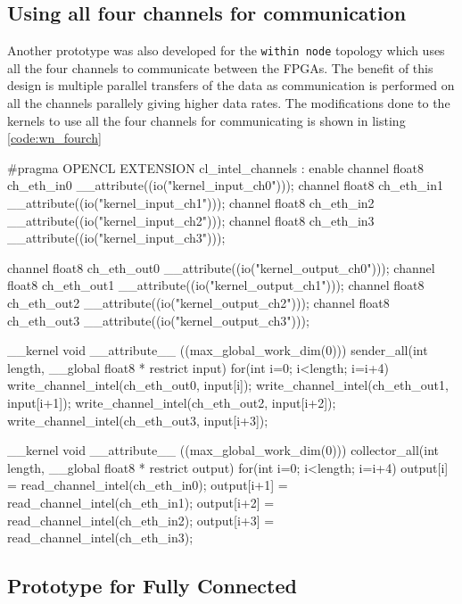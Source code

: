 \subsection*{Using all four channels for communication}

Another prototype was also developed for the \texttt{within node} topology which uses all the four channels
to communicate between the FPGAs. The benefit of this design is multiple parallel transfers of the data
as communication is performed on all the channels parallely giving higher data rates. The modifications
done to the kernels to use all the four channels for communicating is shown in listing \ref{code:wn_fourch}

\begin{CppCode}[caption=Kernels for \texttt{within node} using four channels, frame=tlrb, label=code:wn_fourch]
#pragma OPENCL EXTENSION cl_intel_channels : enable
channel float8 ch_eth_in0 __attribute((io("kernel_input_ch0")));
channel float8 ch_eth_in1 __attribute((io("kernel_input_ch1")));
channel float8 ch_eth_in2 __attribute((io("kernel_input_ch2")));
channel float8 ch_eth_in3 __attribute((io("kernel_input_ch3")));

channel float8 ch_eth_out0 __attribute((io("kernel_output_ch0")));
channel float8 ch_eth_out1 __attribute((io("kernel_output_ch1")));
channel float8 ch_eth_out2 __attribute((io("kernel_output_ch2")));
channel float8 ch_eth_out3 __attribute((io("kernel_output_ch3")));

__kernel void __attribute__ ((max_global_work_dim(0)))
sender_all(int length, __global float8 * restrict input)
{
    for(int i=0; i<length; i=i+4)
    {
        write_channel_intel(ch_eth_out0, input[i]);
        write_channel_intel(ch_eth_out1, input[i+1]);
        write_channel_intel(ch_eth_out2, input[i+2]);
        write_channel_intel(ch_eth_out3, input[i+3]);
    }
}

__kernel void __attribute__ ((max_global_work_dim(0)))
collector_all(int length, __global float8 * restrict output)
{
    for(int i=0; i<length; i=i+4)
    {
        output[i] = read_channel_intel(ch_eth_in0);
        output[i+1] = read_channel_intel(ch_eth_in1);
        output[i+2] = read_channel_intel(ch_eth_in2);
        output[i+3] = read_channel_intel(ch_eth_in3);
    }
}
\end{CppCode}

\subsection{Prototype for Fully Connected}


